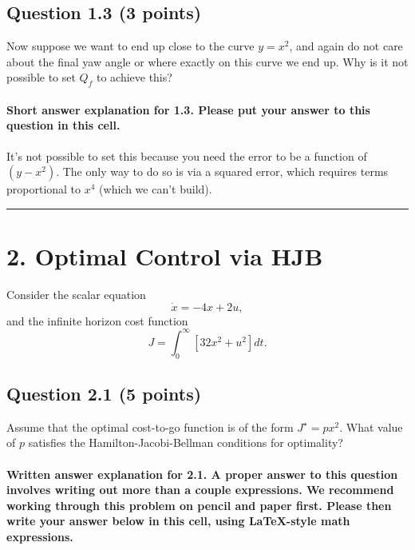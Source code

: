 \documentclass[11pt]{article}
\begin{document}
    \subsection{Question 1.3 (3 points)}\label{question-1.3-3-points}

Now suppose we want to end up close to the curve \(y = x^2\), and again
do not care about the final yaw angle or where exactly on this curve we
end up. Why is it not possible to set \(Q_f\) to achieve this?

    \paragraph{Short answer explanation for 1.3. Please put your answer to
this question in this
cell.}\label{short-answer-explanation-for-1.3.-please-put-your-answer-to-this-question-in-this-cell.}

It's not possible to set this because you need the error to be a
function of \((y-x^2)\). The only way to do so is via a squared error,
which requires terms proportional to \(x^4\) (which we can't build).

    \begin{center}\rule{0.5\linewidth}{\linethickness}\end{center}

\section{2. Optimal Control via HJB}\label{optimal-control-via-hjb}

Consider the scalar equation \[
\dot{x} = -4x + 2u,
\] and the infinite horizon cost function \[
J = \int_0^{\infty} [32x^2 + u^2] dt.
\]

    \subsection{Question 2.1 (5 points)}\label{question-2.1-5-points}

Assume that the optimal cost-to-go function is of the form
\(J^\star = px^2\). What value of \(p\) satisfies the
Hamilton-Jacobi-Bellman conditions for optimality?

    \paragraph{Written answer explanation for 2.1. A proper answer to this
question involves writing out more than a couple expressions. We
recommend working through this problem on pencil and paper first. Please
then write your answer below in this cell, using LaTeX-style math
expressions.}\label{written-answer-explanation-for-2.1.-a-proper-answer-to-this-question-involves-writing-out-more-than-a-couple-expressions.-we-recommend-working-through-this-problem-on-pencil-and-paper-first.-please-then-write-your-answer-below-in-this-cell-using-latex-style-math-expressions.}
\end{document}
